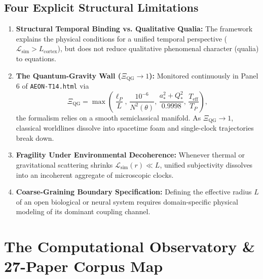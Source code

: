 \documentclass[11pt,a4paper]{article}
\begin{document}
\subsection*{Four Explicit Structural Limitations}
\begin{enumerate}[leftmargin=1.5em]
    \item \textbf{Structural Temporal Binding vs. Qualitative Qualia:} The framework explains the physical conditions for a unified temporal perspective ($\mathcal{L}_{\text{sim}} > L_{\text{cortex}}$), but does not reduce qualitative phenomenal character (qualia) to equations.
    \item \textbf{The Quantum-Gravity Wall ($\Xi_{\text{QG}} \to 1$):} Monitored continuously in Panel 6 of \texttt{AEON-T14.html} via
    \begin{equation}
    \Xi_{\text{QG}} = \max\!\left(\frac{\ell_P}{L},\, \frac{10^{-6}}{N^2(\theta)},\, \frac{a_*^2 + Q_*^2}{0.9998},\, \frac{T_{\text{eff}}}{T_P}\right),
    \end{equation}
    the formalism relies on a smooth semiclassical manifold. As $\Xi_{\text{QG}} \to 1$, classical worldlines dissolve into spacetime foam and single-clock trajectories break down.
    \item \textbf{Fragility Under Environmental Decoherence:} Whenever thermal or gravitational scattering shrinks $\mathcal{L}_{\text{sim}}(r) \ll L$, unified subjectivity dissolves into an incoherent aggregate of microscopic clocks.
    \item \textbf{Coarse-Graining Boundary Specification:} Defining the effective radius $L$ of an open biological or neural system requires domain-specific physical modeling of its dominant coupling channel.
\end{enumerate}

\section{The Computational Observatory \& 27-Paper Corpus Map}
\end{document}
